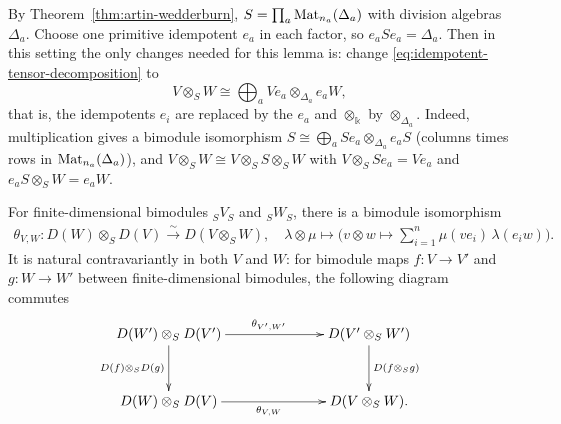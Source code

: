 \begin{advanced}
\begin{remark}[General $S$]\label{rem:idempotent-tensors-general}
By Theorem~\ref{thm:artin-wedderburn}, $S=\prod_a\operatorname{Mat}\nolimits_{n_a}(\Delta_a)$ with division algebras $\Delta_a$.
Choose one primitive idempotent $e_a$ in each factor, so $e_aSe_a=\Delta_a$.
Then in this setting the only changes needed for this lemma is:  change \eqref{eq:idempotent-tensor-decomposition} to
\[
V\otimes_SW\cong\bigoplus_aVe_a\otimes_{\Delta_a}e_aW,
\]
that is, the idempotents $e_i$ are replaced by the $e_a$ and $\otimes_\Bbbk$ by $\otimes_{\Delta_a}$.
Indeed, multiplication gives a bimodule isomorphism $S\cong\bigoplus_aSe_a\otimes_{\Delta_a}e_aS$ (columns times rows in $\operatorname{Mat}\nolimits_{n_a}(\Delta_a)$), and $V\otimes_SW\cong V\otimes_SS\otimes_SW$ with $V\otimes_SSe_a=Ve_a$ and $e_aS\otimes_SW=e_aW$.
\end{remark}
\end{advanced}

\begin{proposition}\label{prop:D-tensor-duals}
For finite-dimensional bimodules ${}_SV_S$ and ${}_SW_S$, there is a bimodule isomorphism
\begin{equation}\label{eq:D-tensor-duals}
\begin{aligned}
\theta_{V,W}:D(W)\otimes_S D(V)\xrightarrow{\sim}D(V\otimes_S W), \quad
\lambda\otimes\mu \mapsto \Big(v\otimes w\mapsto \sum_{i=1}^n\mu(ve_i)\,\lambda(e_iw)\Big).
\end{aligned}
\end{equation}
It is natural contravariantly in both $V$ and $W$: for bimodule maps $f:V\to V'$ and $g:W\to W'$ between finite-dimensional bimodules, the following diagram commutes
\begin{equation}\label{eq:D-tensor-binaturality}
\vcenter{\xymatrix@C=70pt@R=32pt{
D(W')\otimes_S D(V')
\ar[r]^{\theta_{V',W'}}
\ar[d]_{D(f)\otimes_S D(g)}
& D(V'\otimes_S W')
\ar[d]^{D(f\otimes_S g)}\\
D(W)\otimes_S D(V)
\ar[r]_{\theta_{V,W}}
& D(V\otimes_S W).
}}
\end{equation}
\end{proposition}

